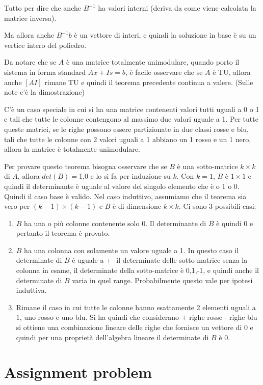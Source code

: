 Tutto per dire che anche $B^{-1}$ ha valori interni (deriva da come viene calcolata la matrice inversa).

Ma allora anche $B^{-1}b$ è un vettore di interi, e quindi la soluzione in base è su un vertice intero del poliedro.


Da notare che se $A$ è una matrice totalmente unimodulare, quando porto il sistema in forma standard $Ax + Is = b$, è facile osservare che se $A$ è TU, allora anche $[A I]$ rimane TU e quindi il teorema precedente continua a valere. (Sulle note c'è la dimostrazione)  


C'è un caso speciale in cui si ha una matrice contenenti valori tutti uguali a 0 o 1 e tali che tutte le colonne contengono al massimo due valori uguale a 1. Per tutte queste matrici, se le righe possono essere partizionate in due classi rosse e blu, tali che tutte le colonne con 2 valori uguali a 1 abbiano un 1 rosso e un 1 nero, allora la matrice è totalmente unimodulare.

Per provare questo teorema bisogna osservare che se $B$ è una sotto-matrice $k \times k$ di $A$, allora $det(B) = $1,0 e lo si fa per induzione su $k$.
Con $k = 1$, $B$ è $1 \times 1$ e quindi il determinante è uguale al valore del singolo elemento che è o 1 o 0. Quindi il caso base è valido.
Nel caso induttivo, assumiamo che il teorema sia vero per $(k-1) \times (k-1)$ e $B$ è di dimensione $k \times k$. Ci sono 3 possibili casi:

\begin{enumerate}
	\item $B$ ha una o più colonne contenente solo 0. Il determinante di $B$ è quindi 0 e pertanto il teorema è provato.
	\item $B$ ha una colonna con solamente un valore uguale a 1. In questo caso il determinate di $B$ è uguale a +- il determinate delle sotto-matrice senza la colonna in esame, il determinate della sotto-matrice è 0,1,-1, e quindi anche il determinate di $B$ varia in quel range. Probabilmente questo vale per ipotesi induttiva.
	\item Rimane il caso in cui tutte le colonne hanno esattamente 2 elementi uguali a $1$, uno rosso e uno blu. Si ha quindi che considerano + righe rosse - righe blu si ottiene una combinazione lineare delle righe che fornisce un vettore di 0 e quindi per una proprietà dell'algebra lineare il determinate di $B$ è 0.
\end{enumerate}

\section{Assignment problem}

